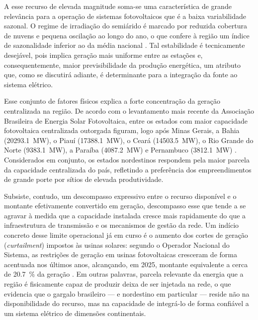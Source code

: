 A esse recurso de elevada magnitude soma-se uma característica de grande
relevância para a operação de sistemas fotovoltaicos que é a baixa variabilidade
sazonal. O regime de irradiação do semiárido é marcado por reduzida cobertura
de nuvens e pequena oscilação ao longo do ano, o que confere à região um índice
de sazonalidade inferior ao da média nacional \cite{Pereira2017,WorldBank2020}.
Tal estabilidade é tecnicamente desejável, pois implica geração mais uniforme
entre as estações e, consequentemente, maior previsibilidade da produção
energética, um atributo que, como se discutirá adiante, é determinante para a
integração da fonte ao sistema elétrico.

Esse conjunto de fatores físicos explica a forte concentração da geração
centralizada na região. De acordo com o levantamento mais recente da
Associação Brasileira de Energia Solar Fotovoltaica, entre os estados com maior
capacidade fotovoltaica centralizada outorgada figuram, logo após Minas Gerais,
a Bahia (\SI{20293,1}{\mega\watt}), o Piauí (\SI{17388,1}{\mega\watt}), o Ceará
(\SI{14503,5}{\mega\watt}), o Rio Grande do Norte (\SI{9383,1}{\mega\watt}), a
Paraíba (\SI{4087,2}{\mega\watt}) e Pernambuco (\SI{3812,1}{\mega\watt})
\cite{absolar2026infografico}. Considerados em conjunto, os estados nordestinos
respondem pela maior parcela da capacidade centralizada do país, refletindo a
preferência dos empreendimentos de grande porte por sítios de elevada
produtividade.

Subsiste, contudo, um descompasso expressivo entre o recurso disponível e o
montante efetivamente convertido em geração, descompasso esse que tende a se
agravar à medida que a capacidade instalada cresce mais rapidamente do que a
infraestrutura de transmissão e os mecanismos de gestão da rede. Um indício
concreto desse limite operacional já em curso é o aumento dos cortes de geração
(\textit{curtailment}) impostos às usinas solares: segundo o Operador Nacional
do Sistema, as restrições de geração em usinas fotovoltaicas cresceram de forma
acentuada nos últimos anos, alcançando, em 2025, montante equivalente a cerca
de \SI{20,7}{\percent} da geração \cite{absolar2026infografico}. Em outras
palavras, parcela relevante da energia que a região é fisicamente capaz de
produzir deixa de ser injetada na rede, o que evidencia que o gargalo brasileiro
--- e nordestino em particular --- reside não na disponibilidade do recurso, mas
na capacidade de integrá-lo de forma confiável a um sistema elétrico de
dimensões continentais.

